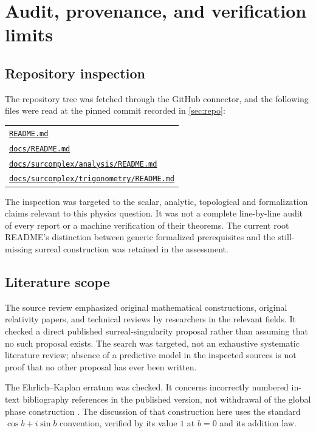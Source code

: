 \documentclass[11pt,a4paper]{article}
\numberwithin{equation}{section}
\theoremstyle{definition}
\theoremstyle{remark}
\newcommand{\repo}[1]{\href{https://github.com/VladimirReshetnikov/Surreal/blob/39f2be6667ade51bca2b45daa47e289d69c09764/#1}{\nolinkurl{#1}}}
\begin{document}
\clearpage
\section{Audit, provenance, and verification limits}\label{app:audit}

\subsection{Repository inspection}
The repository tree was fetched through the GitHub connector, and the following
files were read at the pinned commit recorded in \cref{sec:repo}:
\begin{center}
\begin{tabular}{@{}l@{}}
\repo{README.md}\\[3pt]
\repo{docs/README.md}\\[3pt]
\repo{docs/surcomplex/analysis/README.md}\\[3pt]
\repo{docs/surcomplex/trigonometry/README.md}
\end{tabular}
\end{center}
The inspection was targeted to the scalar, analytic, topological and
formalization claims relevant to this physics question. It was not a complete
line-by-line audit of every report or a machine verification of their theorems.
The current root README's distinction between generic formalized prerequisites
and the still-missing surreal construction was retained in the assessment.

\subsection{Literature scope}
The source review emphasized original mathematical constructions, original
relativity papers, and technical reviews by researchers in the relevant
fields. It checked a direct published surreal-singularity proposal rather than
assuming that no such proposal exists. The search was targeted, not an
exhaustive systematic literature review; absence of a predictive model in the
inspected sources is not proof that no other proposal has ever been written.

The Ehrlich--Kaplan erratum was checked. It concerns incorrectly numbered
in-text bibliography references in the published version, not withdrawal of
the global phase construction \cite{EKErratum}. The discussion of that
construction here uses the standard $\cos b+i\sin b$ convention, verified by
its value $1$ at $b=0$ and its addition law.
\end{document}
